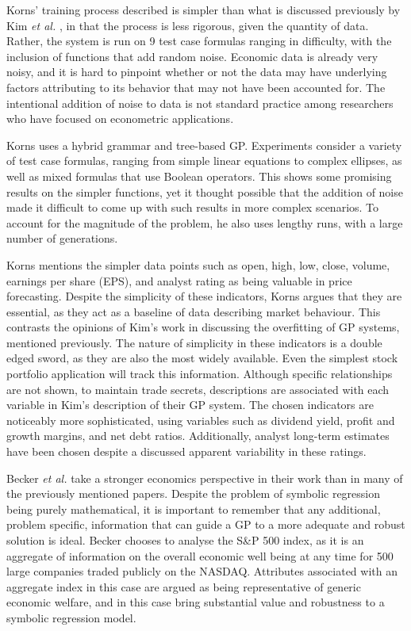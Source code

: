 \documentclass[12pt, letterpaper]{article}
\begin{document}
\textrm{ \indent Korns' training process described is simpler than what is discussed previously by Kim \textit{et al.} \cite{overfitting}, in that the process is less rigorous, given the quantity of data. Rather, the system is run on 9 test case formulas ranging in difficulty, with the inclusion of functions that add random noise. Economic data is already very noisy, and it is hard to pinpoint whether or not the data may have underlying factors attributing to its behavior that may not have been accounted for. The intentional addition of noise to data is not standard practice among researchers who have focused on econometric applications. }

\textrm{ \indent Korns \cite{korns} uses a hybrid grammar and tree-based GP. Experiments consider a variety of test case formulas, ranging from simple linear equations to complex ellipses, as well as mixed formulas that use Boolean operators. This shows some promising results on the simpler functions, yet it thought possible that the addition of noise made it difficult to come up with such results in more complex scenarios. To account for the magnitude of the problem, he also uses lengthy runs, with a large number of generations.  }

\textrm{ \indent Korns \cite{korns} mentions the simpler data points such as open, high, low, close, volume, earnings per share (EPS), and analyst rating as being valuable in price forecasting. Despite the simplicity of these indicators, Korns argues that they are essential, as they act as a baseline of data describing market behaviour. This contrasts the opinions of Kim's \cite{overfitting} work in discussing the overfitting of GP systems, mentioned previously. The nature of simplicity in these indicators is a double edged sword, as they are also the most widely available. Even the simplest stock portfolio application will track this information. Although specific relationships are not shown, to maintain trade secrets, descriptions are associated with each variable in Kim's \cite{overfitting} description of their GP system. The chosen indicators are noticeably more sophisticated, using variables such as dividend yield, profit and growth margins, and net debt ratios. Additionally, analyst long-term estimates have been chosen despite a discussed apparent variability in these ratings. }

\textrm{ \indent Becker \textit{et al.} \cite{stockselectinnovate} take a stronger economics perspective in their work than in many of the previously mentioned papers. Despite the problem of symbolic regression being purely mathematical, it is important to remember that any additional, problem specific, information that can guide a GP to a more adequate and robust solution is ideal. Becker chooses to analyse the S\&P 500 index, as it is an aggregate of information on the overall economic well being at any time for 500 large companies traded publicly on the NASDAQ. Attributes associated with an aggregate index in this case are argued as being representative of generic economic welfare, and in this case bring substantial value and robustness to a symbolic regression model. } 
\end{document}
